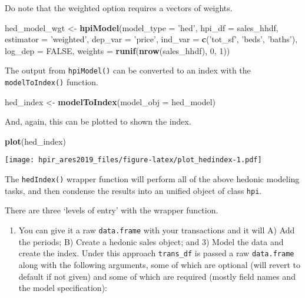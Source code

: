 \documentclass[]{article}
\newenvironment{Shaded}{\begin{snugshade}}{\end{snugshade}}
\newcommand{\KeywordTok}[1]{\textcolor[rgb]{0.13,0.29,0.53}{\textbf{#1}}}
\newcommand{\DataTypeTok}[1]{\textcolor[rgb]{0.13,0.29,0.53}{#1}}
\newcommand{\DecValTok}[1]{\textcolor[rgb]{0.00,0.00,0.81}{#1}}
\newcommand{\StringTok}[1]{\textcolor[rgb]{0.31,0.60,0.02}{#1}}
\newcommand{\OtherTok}[1]{\textcolor[rgb]{0.56,0.35,0.01}{#1}}
\newcommand{\NormalTok}[1]{#1}
\providecommand{\tightlist}{%
  \setlength{\itemsep}{0pt}\setlength{\parskip}{0pt}}
\begin{document}
Do note that the weighted option requires a vectors of weights.

\begin{Shaded}
\begin{Highlighting}[]
\NormalTok{  hed_model_wgt <-}\StringTok{ }\KeywordTok{hpiModel}\NormalTok{(}\DataTypeTok{model_type =} \StringTok{'hed'}\NormalTok{,}
                            \DataTypeTok{hpi_df =}\NormalTok{ sales_hhdf,}
                            \DataTypeTok{estimator =} \StringTok{'weighted'}\NormalTok{,}
                            \DataTypeTok{dep_var =} \StringTok{'price'}\NormalTok{,}
                            \DataTypeTok{ind_var =} \KeywordTok{c}\NormalTok{(}\StringTok{'tot_sf'}\NormalTok{, }\StringTok{'beds'}\NormalTok{, }\StringTok{'baths'}\NormalTok{),}
                            \DataTypeTok{log_dep =} \OtherTok{FALSE}\NormalTok{,}
                            \DataTypeTok{weights =} \KeywordTok{runif}\NormalTok{(}\KeywordTok{nrow}\NormalTok{(sales_hhdf), }\DecValTok{0}\NormalTok{, }\DecValTok{1}\NormalTok{))}
\end{Highlighting}
\end{Shaded}

The output from \texttt{hpiModel()} can be converted to an index with
the \texttt{modelToIndex()} function.

\begin{Shaded}
\begin{Highlighting}[]
\NormalTok{  hed_index <-}\StringTok{ }\KeywordTok{modelToIndex}\NormalTok{(}\DataTypeTok{model_obj =}\NormalTok{ hed_model)}
\end{Highlighting}
\end{Shaded}

And, again, this can be plotted to shown the index.

\begin{Shaded}
\begin{Highlighting}[]
  \KeywordTok{plot}\NormalTok{(hed_index)}
\end{Highlighting}
\end{Shaded}

\texttt{[image: hpir\_ares2019\_files/figure-latex/plot\_hedindex-1.pdf]}

The \texttt{hedIndex()} wrapper function will perform all of the above
hedonic modeling tasks, and then condense the results into an unified
object of class \texttt{hpi}.

There are three `levels of entry' with the wrapper function.

\begin{enumerate}
\def\labelenumi{\arabic{enumi}.}
\tightlist
\item
  You can give it a raw \texttt{data.frame} with your transactions and
  it will A) Add the periods; B) Create a hedonic sales object; and 3)
  Model the data and create the index. Under this approach
  \texttt{trans\_df} is passed a raw \texttt{data.frame} along with the
  following arguments, some of which are optional (will revert to
  default if not given) and some of which are required (mostly field
  names and the model specification):
\end{enumerate}
\end{document}
